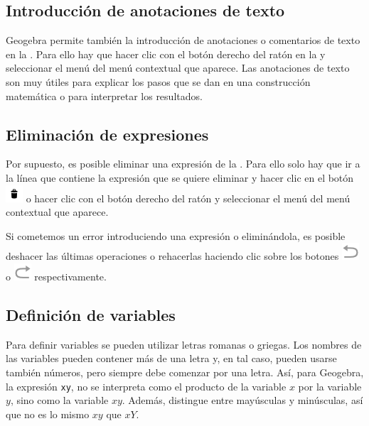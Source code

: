 \subsection*{Introducción de anotaciones de texto}
Geogebra permite también la introducción de anotaciones o comentarios de texto en la .
Para ello hay que hacer clic con el botón derecho del ratón en la  y seleccionar el menú  del menú contextual que aparece.
Las anotaciones de texto son muy útiles para explicar los pasos que se dan en una construcción matemática o para interpretar los resultados.


\subsection*{Eliminación de expresiones}
Por supuesto, es posible eliminar una expresión de la .
Para ello solo hay que ir a la línea que contiene la expresión que se quiere eliminar y hacer clic en el botón \includegraphics[scale=0.035]{img/introduccion/bin-button.png} o hacer clic con el botón derecho del ratón y seleccionar el menú  del menú contextual que aparece.

Si cometemos un error introduciendo una expresión o eliminándola, es posible deshacer las últimas operaciones o rehacerlas haciendo clic sobre los botones \includegraphics[scale=0.03]{img/introduccion/undo-button.png} o \includegraphics[scale=0.03]{img/introduccion/redo-button.png} respectivamente.


\subsection*{Definición de variables}
Para definir variables se pueden utilizar letras romanas o griegas.
Los nombres de las variables pueden contener más de una letra y, en tal caso, pueden usarse también números, pero siempre debe comenzar por una letra. 
Así, para Geogebra, la expresión \texttt{xy}, no se interpreta como el producto de la variable $x$ por la variable $y$, sino como la variable $xy$.
Además, distingue entre mayúsculas y minúsculas, así que no es lo mismo $xy$ que $xY$.


